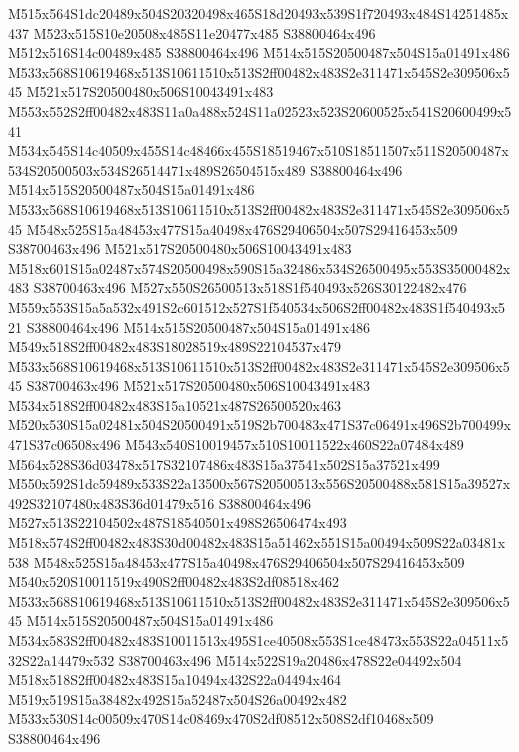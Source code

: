 \documentclass{article}
\begin{document}
\begin{multicols}{2}
M515x564S1dc20489x504S20320498x465S18d20493x539S1f720493x484S14251485x437 M523x515S10e20508x485S11e20477x485 S38800464x496 M512x516S14c00489x485 S38800464x496 M514x515S20500487x504S15a01491x486 M533x568S10619468x513S10611510x513S2ff00482x483S2e311471x545S2e309506x545 M521x517S20500480x506S10043491x483 M553x552S2ff00482x483S11a0a488x524S11a02523x523S20600525x541S20600499x541 M534x545S14c40509x455S14c48466x455S18519467x510S18511507x511S20500487x534S20500503x534S26514471x489S26504515x489 S38800464x496 M514x515S20500487x504S15a01491x486 M533x568S10619468x513S10611510x513S2ff00482x483S2e311471x545S2e309506x545 M548x525S15a48453x477S15a40498x476S29406504x507S29416453x509 S38700463x496 M521x517S20500480x506S10043491x483 M518x601S15a02487x574S20500498x590S15a32486x534S26500495x553S35000482x483 S38700463x496 M527x550S26500513x518S1f540493x526S30122482x476 M559x553S15a5a532x491S2c601512x527S1f540534x506S2ff00482x483S1f540493x521 S38800464x496 M514x515S20500487x504S15a01491x486 M549x518S2ff00482x483S18028519x489S22104537x479 M533x568S10619468x513S10611510x513S2ff00482x483S2e311471x545S2e309506x545 S38700463x496 M521x517S20500480x506S10043491x483 M534x518S2ff00482x483S15a10521x487S26500520x463 M520x530S15a02481x504S20500491x519S2b700483x471S37c06491x496S2b700499x471S37c06508x496 M543x540S10019457x510S10011522x460S22a07484x489 M564x528S36d03478x517S32107486x483S15a37541x502S15a37521x499 M550x592S1dc59489x533S22a13500x567S20500513x556S20500488x581S15a39527x492S32107480x483S36d01479x516 S38800464x496 M527x513S22104502x487S18540501x498S26506474x493 M518x574S2ff00482x483S30d00482x483S15a51462x551S15a00494x509S22a03481x538 M548x525S15a48453x477S15a40498x476S29406504x507S29416453x509 M540x520S10011519x490S2ff00482x483S2df08518x462 M533x568S10619468x513S10611510x513S2ff00482x483S2e311471x545S2e309506x545 M514x515S20500487x504S15a01491x486 M534x583S2ff00482x483S10011513x495S1ce40508x553S1ce48473x553S22a04511x532S22a14479x532 S38700463x496 M514x522S19a20486x478S22e04492x504 M518x518S2ff00482x483S15a10494x432S22a04494x464 M519x519S15a38482x492S15a52487x504S26a00492x482 M533x530S14c00509x470S14c08469x470S2df08512x508S2df10468x509 S38800464x496




\end{multicols}
\end{document}
